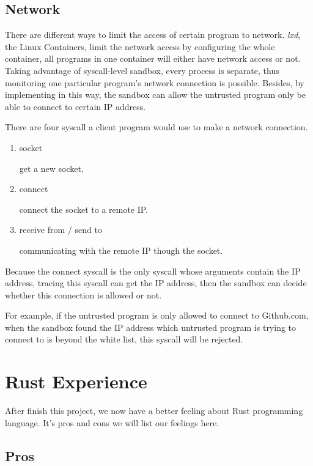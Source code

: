 \documentclass[conference,compsoc]{IEEEtran}
\begin{document}
		\subsection{Network}
			\par
				There are different ways to limit the access of certain program to network. 
				\emph{lxd}, the Linux Containers, limit the network access by configuring the whole container, all programs in one container will either have network access or not. 
				Taking advantage of syscall-level sandbox, every process is separate, thus monitoring one particular program's network connection is possible. 
				Besides, by implementing in this way, the sandbox can allow the untrusted program only be able to connect to certain IP address.
			\par
				There are four syscall a client program would use to make a network connection. 
			\begin{enumerate}
			\item socket
				\par
				get a new socket.
			\item connect
				\par
				connect the socket to a remote IP.
			\item receive from / send to
				\par
				communicating with the remote IP though the socket.
			\end{enumerate}
			\par 
				Because the connect syscall is the only syscall whose arguments contain the IP address, tracing this syscall can get the IP address, then the sandbox can decide whether this connection is allowed or not. 
			\par
				For example, if the untrusted program is only allowed to connect to Github.com, when the sandbox found the IP address which untrusted program is trying to connect to is beyond the white list, this syscall will be rejected.
			


\section{Rust Experience}
	After finish this project, we now have a better feeling about Rust programming language. It's pros and cons we will list our feelings here.
	\subsection{Pros}
		\par
\end{document}
